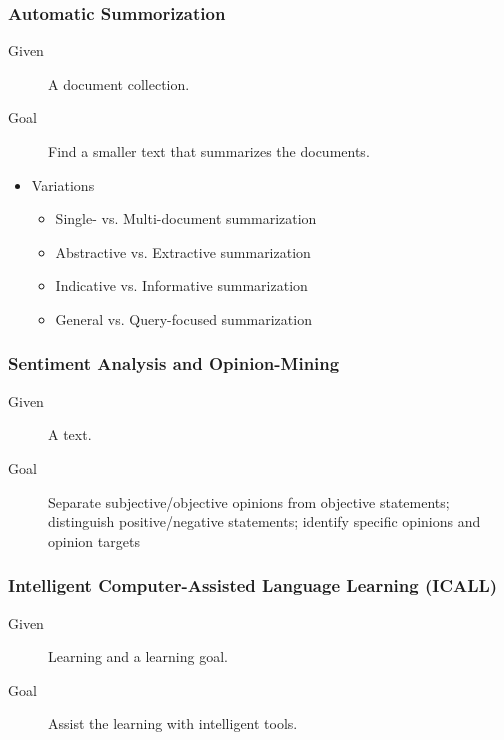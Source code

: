 \documentclass[a4paper, 11pt, accentcolor = tud3b]{tudreport}
\begin{document}
	            \subsubsection{Automatic Summorization} %
		            \begin{description}
		            	\item[Given] A document collection.
		            	\item[Goal] Find a smaller text that summarizes the documents.
		            \end{description}
	            	\begin{itemize}
	            		\item Variations
	            			\begin{itemize}
	            				\item Single- vs. Multi-document summarization
	            				\item Abstractive vs. Extractive summarization
	            				\item Indicative vs. Informative summarization
	            				\item General vs. Query-focused summarization
	            			\end{itemize}
	            	\end{itemize}
	            
	            \subsubsection{Sentiment Analysis and Opinion-Mining} %
		            \begin{description}
		            	\item[Given] A text.
		            	\item[Goal] Separate subjective/objective opinions from objective statements; distinguish positive/negative statements; identify specific opinions and opinion targets
		            \end{description}
	            
	            \subsubsection{Intelligent Computer-Assisted Language Learning (ICALL)} %
		            \begin{description}
		            	\item[Given] Learning and a learning goal.
		            	\item[Goal] Assist the learning with intelligent tools.
		            \end{description}
\end{document}

